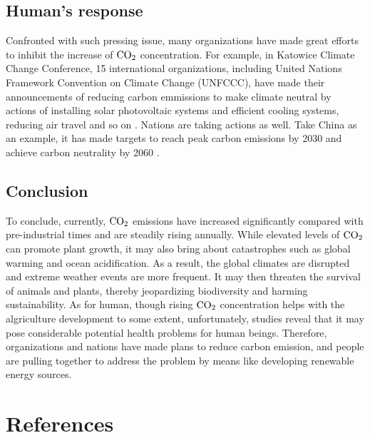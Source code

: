 \documentclass[12pt,a4paper]{article}
\begin{document}
    \subsection{Human's response}
    Confronted with such pressing issue, many organizations have made great efforts to inhibit the increase of $\ce{CO2}$ concentration. For example, in Katowice Climate Change Conference, 15 international organizations, including United Nations Framework Convention on Climate Change (UNFCCC), have made their announcements of reducing carbon emmissions to make climate neutral by actions of installing solar photovoltaic systems and efficient cooling systems, reducing air travel and so on \autocite{unfccc_15_2018}. Nations are taking actions as well. Take China as an example, it has made targets to reach peak carbon emissions by 2030 and achieve carbon neutrality by 2060 \autocite{xinhua_responding_2021}.
    
    \subsection{Conclusion}
    To conclude, currently, $\ce{CO2}$ emissions have increased significantly compared with pre-industrial times and are steadily rising annually. While elevated levels of $\ce{CO2}$ can promote plant growth, it may also bring about catastrophes such as global warming and ocean acidification. As a result, the global climates are disrupted and extreme weather events are more frequent. It may then threaten the survival of animals and plants, thereby jeopardizing biodiversity and harming sustainability. As for human, though rising $\ce{CO2}$ concentration helps with the algriculture development to some extent, unfortunately, studies reveal that it may pose considerable potential health problems for human beings. Therefore, organizations and nations have made plans to reduce carbon emission, and people are pulling together to address the problem by means like developing renewable energy sources.

    
    \newpage
    \section{References}
    \printbibliography[heading=none]
    
\end{document}
